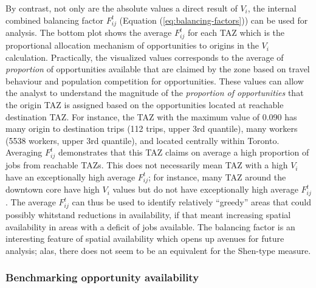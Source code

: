 \documentclass[]{elsarticle} %
\begin{document}
By contrast, not only are the absolute values a direct result of
\(V_i\), the internal combined balancing factor \(F_{ij}^t\) (Equation
(\ref{eq:balancing-factors})) can be used for analysis. The bottom plot
shows the average \(F_{ij}^t\) for each TAZ which is the proportional
allocation mechanism of opportunities to origins in the \(V_i\)
calculation. Practically, the visualized values corresponds to the
average of \emph{proportion} of opportunities available that are claimed
by the zone based on travel behaviour and population competition for
opportunities. These values can allow the analyst to understand the
magnitude of the \emph{proportion of opportunities} that the origin TAZ
is assigned based on the opportunities located at reachable destination
TAZ. For instance, the TAZ with the maximum value of 0.090 has many
origin to destination trips (112 trips, upper 3rd quantile), many
workers (5538 workers, upper 3rd quantile), and located centrally within
Toronto. Averaging \(F_{ij}^t\) demonstrates that this TAZ claims on
average a high proportion of jobs from reachable TAZs. This does not
necessarily mean TAZ with a high \(V_i\) have an exceptionally high
average \(F_{ij}^t\); for instance, many TAZ around the downtown core
have high \(V_i\) values but do not have exceptionally high average
\(F_{ij}^t\). The average \(F_{ij}^t\) can thus be used to identify
relatively ``greedy'' areas that could possibly whitstand reductions in
availability, if that meant increasing spatial availability in areas
with a deficit of jobs available. The balancing factor is an interesting
feature of spatial availability which opens up avenues for future
analysis; alas, there does not seem to be an equivalent for the
Shen-type measure.

\hypertarget{benchmarking-opportunity-availability}{%
\subsubsection{Benchmarking opportunity
availability}\label{benchmarking-opportunity-availability}}
\end{document}
